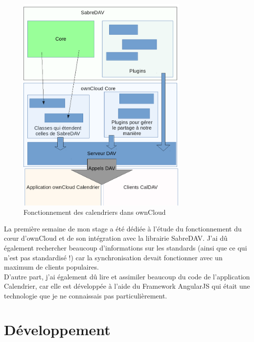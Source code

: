 \documentclass[10pt,a4paper, twoside]{report}
\begin{document}
	\begin{figure}[h]
		\centering
		\includegraphics[width=0.75\textwidth]{images/schema.png}
		\caption{Fonctionnement des calendriers dans ownCloud}
		\label{normal_case}
	\end{figure}
	
	La première semaine de mon stage a été dédiée à l'étude du fonctionnement du cœur d'ownCloud et de son intégration avec la librairie SabreDAV. J'ai dû également rechercher beaucoup d'informations sur les standards (ainsi que ce qui n'est pas standardisé !) car la synchronisation devait fonctionner avec un maximum de clients populaires.
	\\
	
	D'autre part, j'ai également dû lire et assimiler beaucoup du code de l'application Calendrier, car elle est développée à l'aide du Framework AngularJS qui était une technologie que je ne connaissais pas particulièrement.
	\chapter{Développement}
\end{document}
